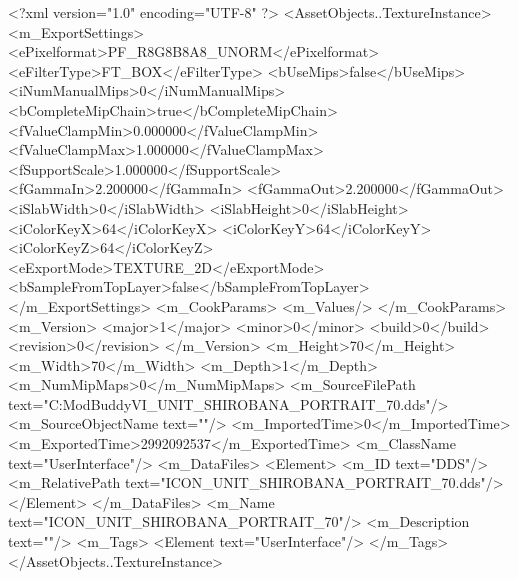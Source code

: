 <?xml version="1.0" encoding="UTF-8" ?>
<AssetObjects..TextureInstance>
	<m_ExportSettings>
		<ePixelformat>PF_R8G8B8A8_UNORM</ePixelformat>
		<eFilterType>FT_BOX</eFilterType>
		<bUseMips>false</bUseMips>
		<iNumManualMips>0</iNumManualMips>
		<bCompleteMipChain>true</bCompleteMipChain>
		<fValueClampMin>0.000000</fValueClampMin>
		<fValueClampMax>1.000000</fValueClampMax>
		<fSupportScale>1.000000</fSupportScale>
		<fGammaIn>2.200000</fGammaIn>
		<fGammaOut>2.200000</fGammaOut>
		<iSlabWidth>0</iSlabWidth>
		<iSlabHeight>0</iSlabHeight>
		<iColorKeyX>64</iColorKeyX>
		<iColorKeyY>64</iColorKeyY>
		<iColorKeyZ>64</iColorKeyZ>
		<eExportMode>TEXTURE_2D</eExportMode>
		<bSampleFromTopLayer>false</bSampleFromTopLayer>
	</m_ExportSettings>
	<m_CookParams>
		<m_Values/>
	</m_CookParams>
	<m_Version>
		<major>1</major>
		<minor>0</minor>
		<build>0</build>
		<revision>0</revision>
	</m_Version>
	<m_Height>70</m_Height>
	<m_Width>70</m_Width>
	<m_Depth>1</m_Depth>
	<m_NumMipMaps>0</m_NumMipMaps>
	<m_SourceFilePath text="C:\Users\asus\Documents\Firaxis ModBuddy\Civilization VI\temppic\ICON_UNIT_SHIROBANA_PORTRAIT_70.dds"/>
	<m_SourceObjectName text=""/>
	<m_ImportedTime>0</m_ImportedTime>
	<m_ExportedTime>2992092537</m_ExportedTime>
	<m_ClassName text="UserInterface"/>
	<m_DataFiles>
		<Element>
			<m_ID text="DDS"/>
			<m_RelativePath text="ICON_UNIT_SHIROBANA_PORTRAIT_70.dds"/>
		</Element>
	</m_DataFiles>
	<m_Name text="ICON_UNIT_SHIROBANA_PORTRAIT_70"/>
	<m_Description text=""/>
	<m_Tags>
		<Element text="UserInterface"/>
	</m_Tags>
</AssetObjects..TextureInstance>

